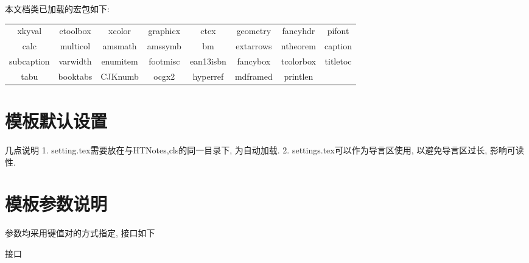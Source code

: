 
本文档类已加载的宏包如下:

\begin{tabular*}{\textwidth}{cccccccc}
\toprule
  xkyval & etoolbox & xcolor & graphicx & ctex & geometry & fancyhdr & pifont \\
  calc & multicol & amsmath & amssymb & bm & extarrows & ntheorem & caption \\
  subcaption & varwidth & enumitem & footmisc & ean13isbn & fancybox & tcolorbox & titletoc \\
  tabu & booktabs & CJKnumb & ocgx2 & hyperref & mdframed & printlen & \\
\bottomrule
\end{tabular*}

\section{模板默认设置} \label{sec:模板默认设置}
\begin{Win}{几点说明}
  1. setting.tex需要放在与HTNotes,cls的同一目录下, 为自动加载.
  2. settings.tex可以作为导言区使用, 以避免导言区过长, 影响可读性.
\end{Win}

\section{模板参数说明} \label{sec:模板参数说明}
  参数均采用键值对的方式指定, 接口如下
  \begin{Code}[LaTeX]{接口}
  \end{Code}

